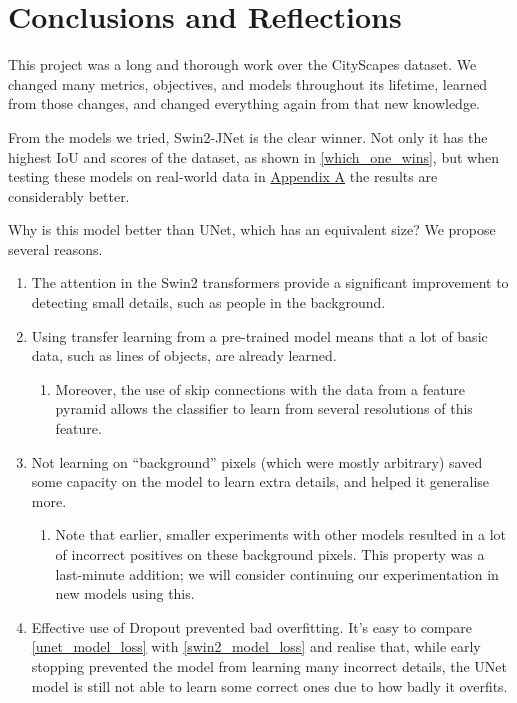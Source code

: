\section{Conclusions and Reflections}

This project was a long and thorough work over the CityScapes dataset.
We changed many metrics, objectives, and models throughout its lifetime, learned from those changes, and changed everything again from that new knowledge.

From the models we tried, Swin2-JNet is the clear winner.
Not only it has the highest IoU and \iiouc{} scores of the dataset, as shown in \cref{which_one_wins}, but when testing these models on real-world data in \hyperref[hackneyscapes]{Appendix A} the results are considerably better.

Why is this model better than UNet, which has an equivalent size?
We propose several reasons.
\begin{enumerate}[topsep=0pt]
	\item The attention in the Swin2 transformers provide a significant improvement to detecting small details, such as people in the background.
	\item Using transfer learning from a pre-trained model means that a lot of basic data, such as lines of objects, are already learned.
		\begin{enumerate}
			\item Moreover, the use of skip connections with the data from a feature pyramid allows the classifier to learn from several resolutions of this feature.
		\end{enumerate}
	\item Not learning on ``background'' pixels (which were mostly arbitrary) saved some capacity on the model to learn extra details, and helped it generalise more.
		\begin{enumerate}
			\item Note that earlier, smaller experiments with other models resulted in a lot of incorrect positives on these background pixels.
				This property was a last-minute addition; we will consider continuing our experimentation in new models using this.
		\end{enumerate}
	\item Effective use of Dropout prevented bad overfitting.
		It's easy to compare \cref{unet_model_loss} with \cref{swin2_model_loss} and realise that, while early stopping prevented the model from learning many incorrect details, the UNet model is still not able to learn some correct ones due to how badly it overfits.
\end{enumerate}

